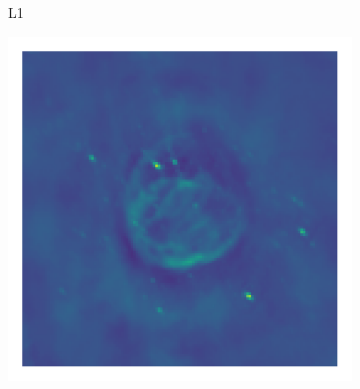 \begin{figure}[h]
\begin{subfigure}[b]{0.3\linewidth}
	\end{subfigure}
	\begin{subfigure}[b]{0.3\linewidth}
		\begin{center}L1\end{center}
		\includegraphics[width=\linewidth, trim={18px 19px 18px 18px}, clip]{./chapters/05.results/g55/L1_image.png}
	\end{subfigure}


\end{figure}
